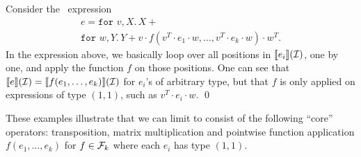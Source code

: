 \begin{example}Consider the \langfor\ expression 
\begin{multline*}
e=\texttt{for }v,X.\, X + \\ 
\texttt{for }w,Y.\, Y + v\cdot f(v^T\cdot e_1\cdot w, \ldots, v^T\cdot e_k\cdot w)\cdot w^T. 
\end{multline*}
In the expression above, we basically loop over all positions in $\llbracket e_i \rrbracket(\mathcal{I})$, one by one, and apply the function $f$ on those positions.  One can see that $\llbracket e \rrbracket(\mathcal{I})=\llbracket f(e_1,\ldots,e_k) \rrbracket(\mathcal{I})$ for $e_i$'s of arbitrary type, but that $f$ is only
applied on expressions of type $(1,1)$, such as $v^T\cdot e_i\cdot w$. \qed
\end{example}
%
%
%
%
%

These examples illustrate that we can limit \langfor to consist of the following ``core'' operators: transposition, matrix multiplication and pointwise function application $f(e_1,\ldots,e_k)$ for $f\in\mathcal{F}_k$ where each $e_i$
has type $(1,1)$. 

